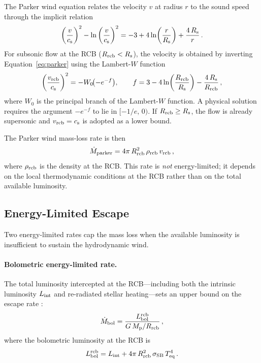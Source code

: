 \documentclass{aastex701}
\newcommand{\Mdot}{\dot{M}}
\newcommand{\Mp}{M_{\rm p}}
\newcommand{\Rrcb}{R_{\rm rcb}}
\newcommand{\Rs}{R_{\rm s}}
\newcommand{\Teq}{T_{\rm eq}}
\newcommand{\cs}{c_{\rm s}}
\newcommand{\Lint}{L_{\rm int}}
\newcommand{\Lbol}{L_{\rm bol}}
\begin{document}
The Parker wind equation relates the velocity $v$ at radius $r$ to the
sound speed through the implicit relation
\begin{equation}\label{eq:parker}
  \left(\frac{v}{\cs}\right)^{2}
  - \ln\left(\frac{v}{\cs}\right)^{2}
  = -3 + 4\ln\!\left(\frac{r}{\Rs}\right) + \frac{4\,\Rs}{r}\,.
\end{equation}
For subsonic flow at the RCB ($\Rrcb < \Rs$), the velocity is obtained
by inverting Equation~\eqref{eq:parker} using the Lambert-$W$ function
\citep[see][]{Cranmer2004}
\begin{equation}\label{eq:lambert}
  \left(\frac{v_{\rm rcb}}{\cs}\right)^{2}
  = -W_{0}\!\bigl(-e^{-f}\bigr),
  \qquad
  f = 3 - 4\ln\!\left(\frac{\Rrcb}{\Rs}\right) - \frac{4\,\Rs}{\Rrcb}\,,
\end{equation}
where $W_{0}$ is the principal branch of the Lambert-$W$ function.  A
physical solution requires the argument $-e^{-f}$ to lie in
$[-1/e,\,0)$.  If $\Rrcb \ge \Rs$, the flow is already supersonic
and $v_{\rm rcb} = \cs$ is adopted as a lower bound.

The Parker wind mass-loss rate is then
\begin{equation}\label{eq:mdot_parker}
  \Mdot_{\rm parker} = 4\pi\,\Rrcb^{2}\,\rho_{\rm rcb}\,v_{\rm rcb}\,,
\end{equation}
where $\rho_{\rm rcb}$ is the density at the RCB.  This rate is
\emph{not} energy-limited; it depends on the local thermodynamic
conditions at the RCB rather than on the total available luminosity.

\subsection{Energy-Limited Escape}\label{subsec:elim}

Two energy-limited rates cap the mass loss when the available luminosity
is insufficient to sustain the hydrodynamic wind.

\paragraph{Bolometric energy-limited rate.}
The total luminosity intercepted at the RCB---including both the
intrinsic luminosity $\Lint$ and re-radiated stellar heating---sets an
upper bound on the escape rate \citep[Equation~22 of][]{Tang2024}:
\begin{equation}\label{eq:mdot_bol}
  \Mdot_{\rm bol} = \frac{\Lbol^{\rm rcb}}{G\,\Mp / \Rrcb}\,,
\end{equation}
where the bolometric luminosity at the RCB is
\begin{equation}\label{eq:Lbol}
  \Lbol^{\rm rcb} = \Lint + 4\pi\,\Rrcb^{2}\,\sigma_{\rm SB}\,\Teq^{4}\,.
\end{equation}
\end{document}

